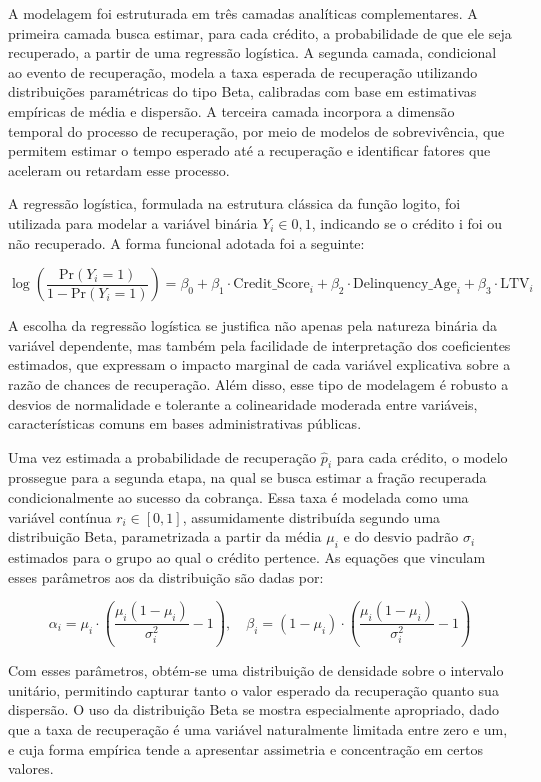 \documentclass[a4paper,12pt]{article}
\begin{document}
A modelagem foi estruturada em três camadas analíticas complementares. A primeira camada busca estimar, para cada crédito, a probabilidade de que ele seja recuperado, a partir de uma regressão logística. A segunda camada, condicional ao evento de recuperação, modela a taxa esperada de recuperação utilizando distribuições paramétricas do tipo Beta, calibradas com base em estimativas empíricas de média e dispersão. A terceira camada incorpora a dimensão temporal do processo de recuperação, por meio de modelos de sobrevivência, que permitem estimar o tempo esperado até a recuperação e identificar fatores que aceleram ou retardam esse processo.

A regressão logística, formulada na estrutura clássica da função logito, foi utilizada para modelar a variável binária $Y_i \in {0,1}$, indicando se o crédito i foi ou não recuperado. A forma funcional adotada foi a seguinte:

\[ \log \left( \frac{\text{Pr}(Y_i = 1)}{1 - \text{Pr}(Y_i = 1)} \right) = \beta_0 + \beta_1 \cdot \text{Credit\_Score}_i + \beta_2 \cdot \text{Delinquency\_Age}_i + \beta_3 \cdot \text{LTV}_i \]
 
A escolha da regressão logística se justifica não apenas pela natureza binária da variável dependente, mas também pela facilidade de interpretação dos coeficientes estimados, que expressam o impacto marginal de cada variável explicativa sobre a razão de chances de recuperação. Além disso, esse tipo de modelagem é robusto a desvios de normalidade e tolerante a colinearidade moderada entre variáveis, características comuns em bases administrativas públicas.

Uma vez estimada a probabilidade de recuperação $\hat{p}_{i}$ para cada crédito, o modelo prossegue para a segunda etapa, na qual se busca estimar a fração recuperada condicionalmente ao sucesso da cobrança. Essa taxa é modelada como uma variável contínua 
$r_{i} \in [0,1]$, assumidamente distribuída segundo uma distribuição Beta, parametrizada a partir da média $\mu_{i}$ e do desvio padrão $\sigma_{i}$ estimados para o grupo ao qual o crédito pertence. As equações que vinculam esses parâmetros aos da distribuição são dadas por:

\[ \alpha_i = \mu_i \cdot \left( \frac{\mu_i (1 - \mu_i)}{\sigma_i^2} - 1 \right), \quad \beta_i = (1 - \mu_i) \cdot \left( \frac{\mu_i (1 - \mu_i)}{\sigma_i^2} - 1 \right) \]

Com esses parâmetros, obtém-se uma distribuição de densidade sobre o intervalo unitário, permitindo capturar tanto o valor esperado da recuperação quanto sua dispersão. O uso da distribuição Beta se mostra especialmente apropriado, dado que a taxa de recuperação é uma variável naturalmente limitada entre zero e um, e cuja forma empírica tende a apresentar assimetria e concentração em certos valores.
\end{document}
